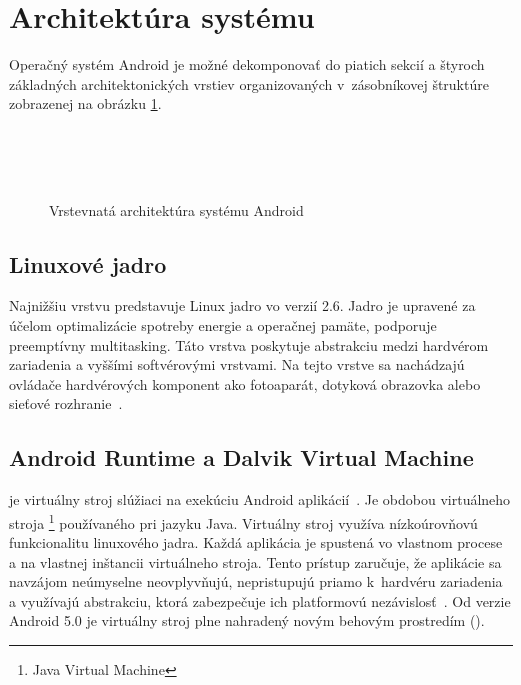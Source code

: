 \section{Architektúra systému}
Operačný systém Android je možné dekomponovať do piatich sekcií a štyroch základných architektonických vrstiev organizovaných v~zásobníkovej štruktúre zobrazenej na obrázku \ref{fig:struktura}.
\begin{figure} [htb]
 \centering
	\\
	\\
	\\
  \caption{Vrstevnatá architektúra systému Android}
  \label{fig:struktura}
\end{figure}
\subsection{Linuxové jadro}
Najnižšiu vrstvu predstavuje Linux jadro vo verzií 2.6. Jadro je upravené za účelom optimalizácie spotreby energie a operačnej pamäte, podporuje preemptívny multitasking. Táto vrstva poskytuje abstrakciu medzi hardvérom zariadenia a vyššími softvérovými vrstvami. Na tejto vrstve sa nachádzajú ovládače hardvérových komponent ako fotoaparát, dotyková obrazovka alebo sieťové rozhranie~\cite{architecture}.
\subsection{Android Runtime a Dalvik Virtual Machine}
 je virtuálny stroj slúžiaci na exekúciu Android aplikácií~\cite{dalvik}. Je obdobou virtuálneho stroja \footnote{Java Virtual Machine} používaného pri jazyku Java. Virtuálny stroj  využíva nízkoúrovňovú funkcionalitu linuxového jadra. Každá aplikácia je spustená vo vlastnom procese a na vlastnej inštancii virtuálneho stroja. Tento prístup zaručuje, že aplikácie sa navzájom neúmyselne neovplyvňujú, nepristupujú priamo k~hardvéru zariadenia a využívajú abstrakciu, ktorá zabezpečuje ich platformovú nezávislosť~\cite{architecture}.  Od verzie Android 5.0 je virtuálny stroj  plne nahradený novým behovým prostredím  ().
